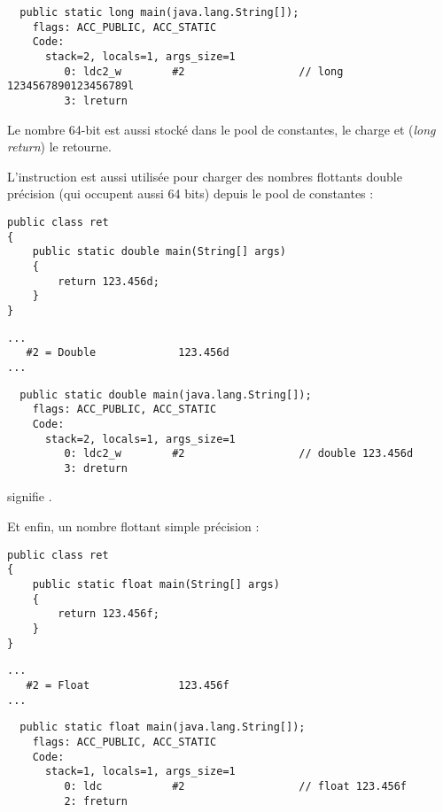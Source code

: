 \begin{lstlisting}
  public static long main(java.lang.String[]);
    flags: ACC_PUBLIC, ACC_STATIC
    Code:
      stack=2, locals=1, args_size=1
         0: ldc2_w        #2                  // long 1234567890123456789l
         3: lreturn       
\end{lstlisting}

Le nombre 64-bit est aussi stocké dans le pool de constantes,  le charge et  
(\emph{long return}) le retourne.

L'instruction  est aussi utilisée pour charger des nombres flottants double précision 
(qui occupent aussi 64 bits) depuis le pool de constantes :

\begin{lstlisting}[style=customjava]
public class ret
{
	public static double main(String[] args)
	{
		return 123.456d;
	}
}
\end{lstlisting}

\begin{lstlisting}[caption=Constant pool]
...
   #2 = Double             123.456d
...
\end{lstlisting}

\begin{lstlisting}
  public static double main(java.lang.String[]);
    flags: ACC_PUBLIC, ACC_STATIC
    Code:
      stack=2, locals=1, args_size=1
         0: ldc2_w        #2                  // double 123.456d
         3: dreturn       
\end{lstlisting}

 signifie .

Et enfin, un nombre flottant simple précision :

\begin{lstlisting}[style=customjava]
public class ret
{
	public static float main(String[] args)
	{
		return 123.456f;
	}
}
\end{lstlisting}

\begin{lstlisting}[caption=Constant pool]
...
   #2 = Float              123.456f
...
\end{lstlisting}

\begin{lstlisting}
  public static float main(java.lang.String[]);
    flags: ACC_PUBLIC, ACC_STATIC
    Code:
      stack=1, locals=1, args_size=1
         0: ldc           #2                  // float 123.456f
         2: freturn       
\end{lstlisting}

